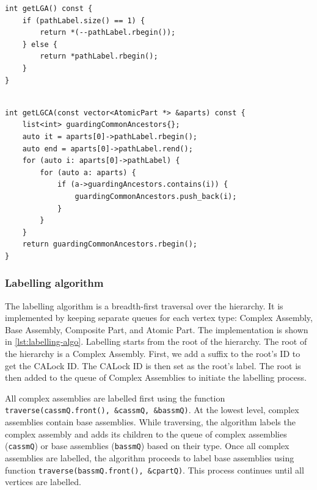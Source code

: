 \begin{lstlisting}[caption={Finding LGA using path label.}, label={lst:findLGA}]
int getLGA() const {
    if (pathLabel.size() == 1) {
        return *(--pathLabel.rbegin());
    } else {
        return *pathLabel.rbegin();
    }
}
\end{lstlisting}


\begin{lstlisting}[caption={Finding the LGCA of a set of atomic parts.}, label={lst:findLGCA}]

int getLGCA(const vector<AtomicPart *> &aparts) const {
    list<int> guardingCommonAncestors{};
    auto it = aparts[0]->pathLabel.rbegin();
    auto end = aparts[0]->pathLabel.rend();
    for (auto i: aparts[0]->pathLabel) {
        for (auto a: aparts) {
            if (a->guardingAncestors.contains(i)) {
                guardingCommonAncestors.push_back(i);
            }
        }
    }
    return guardingCommonAncestors.rbegin();
}

\end{lstlisting}


\subsubsection{Labelling algorithm}

The labelling algorithm is a breadth-first traversal over the hierarchy. It is implemented by keeping separate queues for each vertex type: Complex Assembly, Base Assembly, Composite Part, and Atomic Part. The implementation is shown in \cref{lst:labelling-algo}.
Labelling starts from the root of the hierarchy. The root of the hierarchy is a Complex Assembly. First, we add a suffix to the root's ID to get the CALock ID. The CALock ID is then set as the root's label. The root is then added to the queue of Complex Assemblies to initiate the labelling process. 

All complex assemblies are labelled first using the function \texttt{traverse(cassmQ.front(), \&cassmQ, \&bassmQ)}. At the lowest level, complex assemblies contain base assemblies. While traversing, the algorithm labels the complex assembly and adds its children to the queue of complex assemblies (\texttt{cassmQ}) or base assemblies (\texttt{bassmQ}) based on their type. Once all complex assemblies are labelled, the algorithm proceeds to label base assemblies using function \texttt{traverse(bassmQ.front(), \&cpartQ)}. This process continues until all vertices are labelled.


